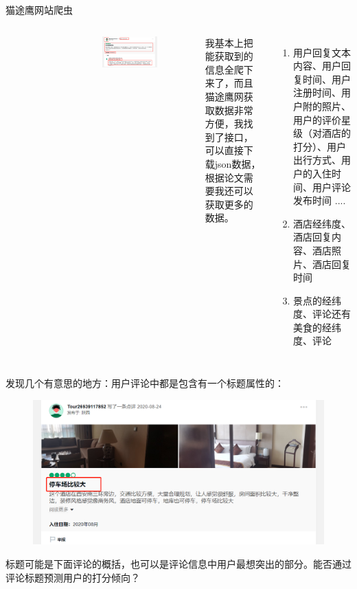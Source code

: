 \documentclass[10pt]{beamer}
\begin{document}
\begin{frame}[plain]{猫途鹰网站爬虫}
\begin{columns}
\begin{figure}
    \end{figure}
        \begin{figure}[ht]
            \centering
            \includegraphics[width=0.9\textwidth]{figures/详细信息.png}
        \end{figure}
        
        \footnotesize{我基本上把能获取到的信息全爬下来了，而且猫途鹰网获取数据非常方便，我找到了接口，可以直接下载json数据，根据论文需要我还可以获取更多的数据。
                \begin{enumerate}
                    \item 用户回复文本内容、用户回复时间、用户注册时间、用户附的照片、用户的评价星级（对酒店的打分）、用户出行方式、用户的入住时间、用户评论发布时间
                    ....
                    \item {\color{red}酒店经纬度}、酒店回复内容、酒店照片、酒店回复时间
                    \item {\color{red}景点的经纬度、评论还有美食的经纬度、评论}
                \end{enumerate}}
    \end{columns}
\end{frame}
\begin{frame}
    发现几个有意思的地方：用户评论中都是包含有一个标题属性的：
    \begin{figure}
        \includegraphics[width=1\textwidth]{figures/评论标题.png}
    \end{figure}
    标题可能是下面评论的概括，也可以是评论信息中用户最想突出的部分。能否通过评论标题预测用户的打分倾向？
\end{frame}
\end{document}
